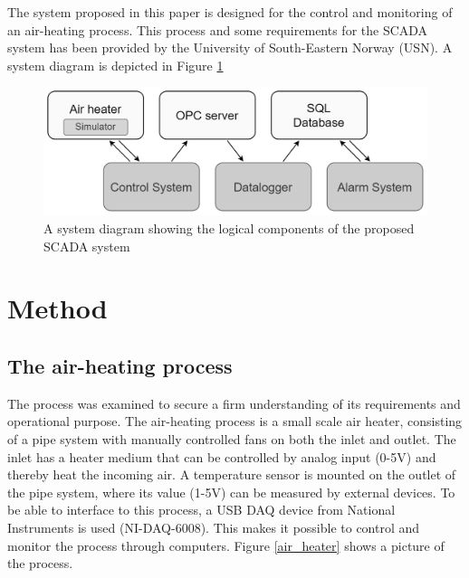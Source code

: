 \documentclass[conference]{IEEEtran}
\begin{document}
The system proposed in this paper is designed for the control and monitoring of an air-heating process. This process and some requirements for the SCADA system has been provided by the University of South-Eastern Norway (USN). A system diagram is depicted in Figure \ref{system_diagram}

\begin{figure}[H]
    \centering
    \includegraphics[scale=0.18]{media/system_diagram_bw.png}
    \caption{A system diagram showing the logical components of the proposed SCADA system}
    \label{system_diagram}
\end{figure}

\section{Method}
\subsection{The air-heating process}
The process was examined to secure a firm understanding of its requirements and operational purpose. The air-heating process is a small scale air heater, consisting of a pipe system with manually controlled fans on both the inlet and outlet. The inlet has a heater medium that can be controlled by analog input (0-5V) and thereby heat the incoming air. A temperature sensor is mounted on the outlet of the pipe system, where its value (1-5V) can be measured by external devices. To be able to interface to this process, a USB DAQ device from National Instruments is used (NI-DAQ-6008). This makes it possible to control and monitor the process through computers. Figure \ref{air_heater} shows a picture of the process.
\end{document}
